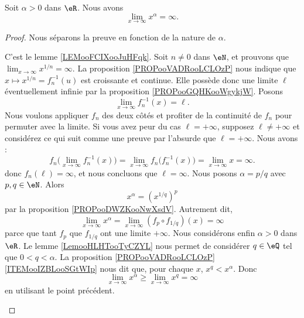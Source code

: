 \begin{proposition}     \label{PROPooJRWCooGiXAYt}
	Soit \( \alpha>0\) dans \( \eR\). Nous avons
	\begin{equation}
		\lim_{x\to \infty} x^{\alpha}=\infty.
	\end{equation}
\end{proposition}

\begin{proof}
	Nous séparons la preuve en fonction de la nature de \( \alpha\).
	\begin{subproof}
		\spitem[Si \( \alpha\in \eN\)]
		C'est le lemme \ref{LEMooFCIXooJuHFqk}.
		\spitem[Si \( \alpha=1/n\)]
		Soit \( n\neq 0\) dans \( \eN\), et prouvons que \( \lim_{x\to \infty} x^{1/n}=\infty\). La proposition \ref{PROPooVADRooLCLOzP} nous indique que \( x\mapsto x^{1/n}=f_n^{-1}(u)\) est croissante et continue. Elle possède donc une limite \( \ell\) éventuellement infinie par la proposition \ref{PROPooGQHKooWgykjW}. Posons
		\begin{equation}
			\lim_{x\to \infty} f_n^{-1}(x)=\ell.
		\end{equation}
		Nous voulons appliquer \( f_n\) des deux côtés et profiter de la continuité de \( f_n\) pour permuter avec la limite. Si vous avez peur du cas \( \ell=+\infty\), supposez \( \ell\neq +\infty\) et considérez ce qui suit comme une preuve par l'absurde que \( \ell=+\infty\). Nous avons :
		\begin{equation}
			f_n\big( \lim_{x\to \infty} f_n^{-1}(x) \big)=\lim_{x\to \infty} f_n\big( f_n^{-1}(x) \big)=\lim_{x\to \infty} x=\infty.
		\end{equation}
		donc \( f_n(\ell)=\infty\), et nous concluons que \( \ell=\infty\).
		\spitem[Si \( \alpha\in \eQ\)]
		Nous posons \( \alpha=p/q\) avec \( p,q\in \eN\). Alors
		\begin{equation}
			x^{\alpha}=(x^{1/q})^p
		\end{equation}
		par la proposition \ref{PROPooDWZKooNwXsdV}. Autrement dit,
		\begin{equation}
			\lim_{x\to \infty} x^{\alpha}=\lim_{x\to \infty} (f_p\circ f_{1/q})(x)=\infty
		\end{equation}
		parce que tant \( f_p\) que \( f_{1/q}\) ont une limite \( +\infty\).
		Nous considérons enfin \( \alpha>0\) dans \( \eR\). Le lemme \ref{LemooHLHTooTyCZYL} nous permet de considérer \( q\in \eQ\) tel que \( 0<q<\alpha\). La proposition \ref{PROPooVADRooLCLOzP}\ref{ITEMooIZBLooSGtWIp} nous dit que, pour chaque \( x\), \( x^q<x^{\alpha}\). Donc
		\begin{equation}
			\lim_{x\to \infty} x^{\alpha}\geq \lim_{x\to \infty} x^q=\infty
		\end{equation}
		en utilisant le point précédent.
	\end{subproof}
\end{proof}

